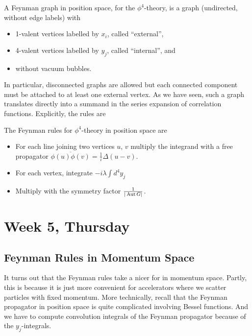 \documentclass[12pt]{article}
\begin{document}
\begin{definition}
  A Feynman graph in position space, for the $\phi^4$-theory, is a
  graph (undirected, without edge labels) with
  \begin{itemize}
  \item 1-valent vertices labelled by $x_i$, called ``external'',
  \item 4-valent vertices labelled by $y_j$, called ``internal'', and
  \item without vacuum bubbles.
  \end{itemize}
\end{definition}
In particular, disconnected graphs are allowed but each connected
component must be attached to at least one external vertex. As we have
seen, such a graph translates directly into a summand in the series
expansion of correlation functions. Explicitly, the rules are
\begin{definition}
  The Feynman rules for $\phi^4$-theory in position space are
  \begin{itemize}
  \item For each line joining two vertices $u$, $v$ multiply the
    integrand with a free propagator $\overline{\phi(u)\phi(v)} =
    \frac{1}{i} \Delta(u-v)$.
  \item For each vertex, integrate $-i\lambda \int d^4y_j$
  \item Multiply with the symmetry factor $\frac{1}{|\operatorname{Aut} G|}$.
  \end{itemize}
\end{definition}



\section{Week 5, Thursday}

\subsection{Feynman Rules in Momentum Space}

It turns out that the Feynman rules take a nicer for in momentum
space. Partly, this is because it is just more convenient for
accelerators where we scatter particles with fixed momentum. More
technically, recall that the Feynman propagator in position space is
quite complicated involving Bessel functions. And we have to compute
convolution integrals of the Feynman propagator because of the
$y_j$-integrals.
\end{document}
